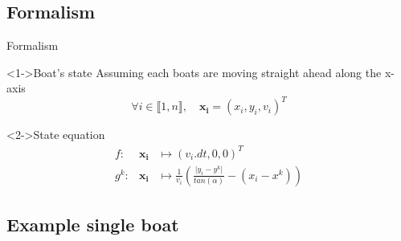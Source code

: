 \documentclass{beamer}
\begin{document}
        \subsection{Formalism}

            \begin{frame}{Formalism}
                \begin{block}<1->{Boat's state}
                    Assuming each boats are moving straight ahead along the x-axis
                    $$\forall i \in \llbracket 1, n\rrbracket, \quad \mathbf{x_i} = (x_i, y_i, v_i)^T$$ 
                \end{block}

                \begin{block}<2->{State equation}
                    \begin{eqnarray}
                        f:& \mathbf{x_i} &\mapsto (v_i.dt, 0, 0)^T \\
                        g^k:& \mathbf{x_i}  &\mapsto \frac{1}{v_i} \left(\frac{\lvert y_i - y^k \rvert}{tan(\alpha)} - (x_i - x^k)\right)
                    \end{eqnarray}
                \end{block}
            \end{frame}
        
        \subsection{Example single boat}
\end{document}

